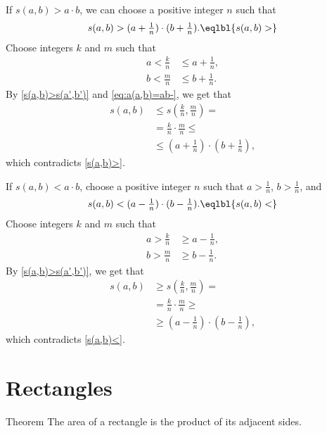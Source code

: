 \raggedcolumns\setlength{\multicolsep}{.5mm}
\setlength{\columnseprule}{1pt}
\begin{multicols}{2}
If $s(a,b)> a\cdot b$,
we can choose a positive integer $n$ such that
\[s(a,b)> (a+\tfrac1n)\cdot (b+\tfrac1n).\eqlbl{s(a,b)>}\]
Choose integers $k$ and $m$ such that
\begin{align*}
a< \tfrac kn&\le a+\tfrac1n,
\\
b<\tfrac mn&\le b+\tfrac1n.
\end{align*}
By \ref{s(a,b)>s(a',b')} and \ref{eq:a(a,b)=ab-}, we get that
\begin{align*}
s(a,b)&\le s(\tfrac kn,\tfrac mn)=
\\
&=\tfrac kn\cdot\tfrac mn\le
\\
&\le (a+\tfrac1n)\cdot(b+\tfrac1n),
\end{align*}
which contradicts \ref{s(a,b)>}.

\columnbreak

If $s(a,b)< a\cdot b$, choose a positive integer $n$ such that $a>\tfrac1n$, $b>\tfrac1n$, and
\[s(a,b)< (a-\tfrac1n)\cdot (b-\tfrac1n).\eqlbl{s(a,b)<}\]
Choose integers $k$ and $m$ such that
\begin{align*}
a> \tfrac kn&\ge a-\tfrac1n,
\\
b>\tfrac mn&\ge b-\tfrac1n.
\end{align*}
By \ref{s(a,b)>s(a',b')}, we get that
\begin{align*}
s(a,b)&\ge s(\tfrac kn,\tfrac mn)=
\\
&=\tfrac kn\cdot\tfrac mn\ge
\\
&\ge (a-\tfrac1n)\cdot(b-\tfrac1n),
\end{align*}
which contradicts \ref{s(a,b)<}.\qeds
\end{multicols}
\setlength{\columnseprule}{0pt}

















\section{Rectangles}

\begin{thm}{Theorem}\label{thm:area-rect}
The area of a rectangle is the product of its adjacent sides.
\end{thm}

